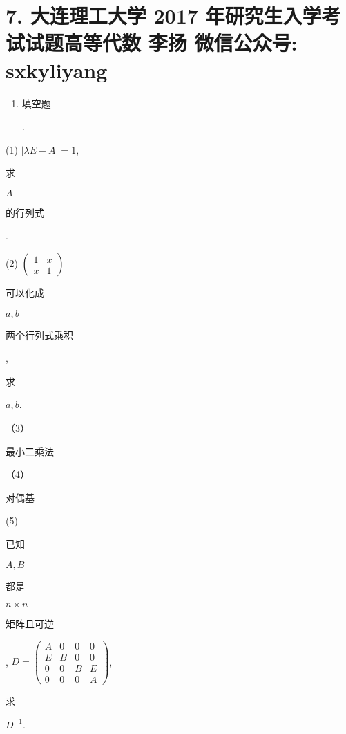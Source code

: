 \documentclass[10pt]{article}
\begin{document}
\section{7. 大连理工大学 2017 年研究生入学考试试题高等代数 
 李扬 
 微信公众号: sxkyliyang}
\begin{enumerate}
  \item \begin{CJK}{UTF8}{mj}填空题\end{CJK}.
\end{enumerate}
(1) $|\lambda E-A|=1$, \begin{CJK}{UTF8}{mj}求\end{CJK} $A$ \begin{CJK}{UTF8}{mj}的行列式\end{CJK}.

(2) $\left(\begin{array}{ll}1 & x \\ x & 1\end{array}\right)$ \begin{CJK}{UTF8}{mj}可以化成\end{CJK} $a, b$ \begin{CJK}{UTF8}{mj}两个行列式乘积\end{CJK}, \begin{CJK}{UTF8}{mj}求\end{CJK} $a, b$.

（3）\begin{CJK}{UTF8}{mj}最小二乘法\end{CJK}

（4）\begin{CJK}{UTF8}{mj}对偶基\end{CJK}

(5) \begin{CJK}{UTF8}{mj}已知\end{CJK} $A, B$ \begin{CJK}{UTF8}{mj}都是\end{CJK} $n \times n$ \begin{CJK}{UTF8}{mj}矩阵且可逆\end{CJK}, $D=\left(\begin{array}{cccc}A & 0 & 0 & 0 \\ E & B & 0 & 0 \\ 0 & 0 & B & E \\ 0 & 0 & 0 & A\end{array}\right)$, \begin{CJK}{UTF8}{mj}求\end{CJK} $D^{-1}$.
\end{document}
